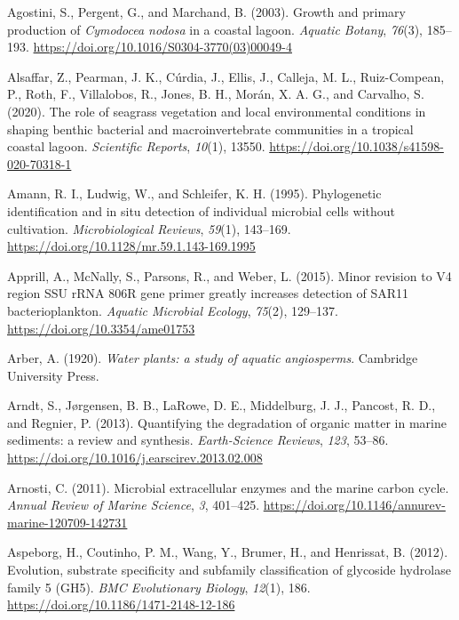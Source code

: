 \documentclass[
  12 pt,
]{book}
\newlength{\cslhangindent}
\newlength{\cslentryspacingunit} %
\newenvironment{CSLReferences}[2] %
 {%
  \setlength{\parindent}{0pt}
  \ifodd #1
  \let\oldpar\par
  \def\par{\hangindent=\cslhangindent\oldpar}
  \fi
  \setlength{\parskip}{#2\cslentryspacingunit}
 }%
 {}
\begin{document}
\hypertarget{refs}{}
\begin{CSLReferences}{1}{0}
\leavevmode{}%
Agostini, S., Pergent, G., and Marchand, B. (2003). Growth and primary production of {{\emph{Cymodocea nodosa}}} in a coastal lagoon. \emph{Aquatic Botany}, \emph{76}(3), 185--193. \url{https://doi.org/10.1016/S0304-3770(03)00049-4}

\leavevmode{}%
Alsaffar, Z., Pearman, J. K., Cúrdia, J., Ellis, J., Calleja, M. L., Ruiz-Compean, P., Roth, F., Villalobos, R., Jones, B. H., Morán, X. A. G., and Carvalho, S. (2020). The role of seagrass vegetation and local environmental conditions in shaping benthic bacterial and macroinvertebrate communities in a tropical coastal lagoon. \emph{Scientific Reports}, \emph{10}(1), 13550. \url{https://doi.org/10.1038/s41598-020-70318-1}

\leavevmode{}%
Amann, R. I., Ludwig, W., and Schleifer, K. H. (1995). Phylogenetic identification and in situ detection of individual microbial cells without cultivation. \emph{Microbiological Reviews}, \emph{59}(1), 143--169. \url{https://doi.org/10.1128/mr.59.1.143-169.1995}

\leavevmode{}%
Apprill, A., McNally, S., Parsons, R., and Weber, L. (2015). Minor revision to {V4} region {SSU rRNA 806R} gene primer greatly increases detection of {SAR11} bacterioplankton. \emph{Aquatic Microbial Ecology}, \emph{75}(2), 129--137. \url{https://doi.org/10.3354/ame01753}

\leavevmode{}%
Arber, A. (1920). \emph{Water plants: a study of aquatic angiosperms}. Cambridge University Press.

\leavevmode{}%
Arndt, S., Jørgensen, B. B., LaRowe, D. E., Middelburg, J. J., Pancost, R. D., and Regnier, P. (2013). Quantifying the degradation of organic matter in marine sediments: a review and synthesis. \emph{Earth-Science Reviews}, \emph{123}, 53--86. \url{https://doi.org/10.1016/j.earscirev.2013.02.008}

\leavevmode{}%
Arnosti, C. (2011). Microbial extracellular enzymes and the marine carbon cycle. \emph{Annual Review of Marine Science}, \emph{3}, 401--425. \url{https://doi.org/10.1146/annurev-marine-120709-142731}

\leavevmode{}%
Aspeborg, H., Coutinho, P. M., Wang, Y., Brumer, H., and Henrissat, B. (2012). Evolution, substrate specificity and subfamily classification of glycoside hydrolase family 5 ({GH5}). \emph{BMC Evolutionary Biology}, \emph{12}(1), 186. \url{https://doi.org/10.1186/1471-2148-12-186}


\end{CSLReferences}
\end{document}
